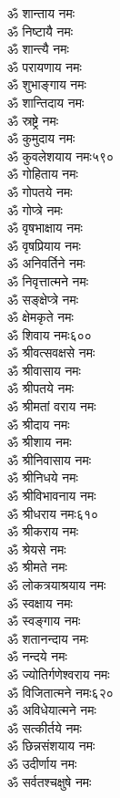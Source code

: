 \begin{multicols}{2}
\begin{flushleft}
ॐ शान्ताय नमः\\
ॐ निष्टायै नमः\\
ॐ शान्त्यै नमः\\
ॐ परायणाय नमः\\
ॐ शुभाङ्गाय नमः\\
ॐ शान्तिदाय नमः\\
ॐ स्रष्ट्रे नमः\\
ॐ कुमुदाय नमः\\
ॐ कुवलेशयाय नमः\hfill ५९०\\
ॐ गोहिताय नमः\\
ॐ गोपतये नमः\\
ॐ गोप्त्रे नमः\\
ॐ वृषभाक्षाय नमः\\
ॐ वृषप्रियाय नमः\\
ॐ अनिवर्तिने नमः\\
ॐ निवृत्तात्मने नमः\\
ॐ सङ्क्षेप्त्रे नमः\\
ॐ क्षेमकृते नमः\\
ॐ शिवाय नमः\hfill ६००\\
ॐ श्रीवत्सवक्षसे नमः\\
ॐ श्रीवासाय नमः\\
ॐ श्रीपतये नमः\\
ॐ श्रीमतां वराय नमः\\
ॐ श्रीदाय नमः\\
ॐ श्रीशाय नमः\\
ॐ श्रीनिवासाय नमः\\
ॐ श्रीनिधये नमः\\
ॐ श्रीविभावनाय नमः\\
ॐ श्रीधराय नमः\hfill ६१०\\
ॐ श्रीकराय नमः\\
ॐ श्रेयसे नमः\\
ॐ श्रीमते नमः\\
ॐ लोकत्रयाश्रयाय नमः\\
ॐ स्वक्षाय नमः\\
ॐ स्वङ्गाय नमः\\
ॐ शतानन्दाय नमः\\
ॐ नन्दये नमः\\
ॐ ज्योतिर्गणेश्वराय नमः\\
ॐ विजितात्मने नमः\hfill ६२०\\
ॐ अविधेयात्मने नमः\\
ॐ सत्कीर्तये नमः\\
ॐ छिन्नसंशयाय नमः\\
ॐ उदीर्णाय नमः\\
ॐ सर्वतश्चक्षुषे नमः\\

\end{flushleft}
\end{multicols}
